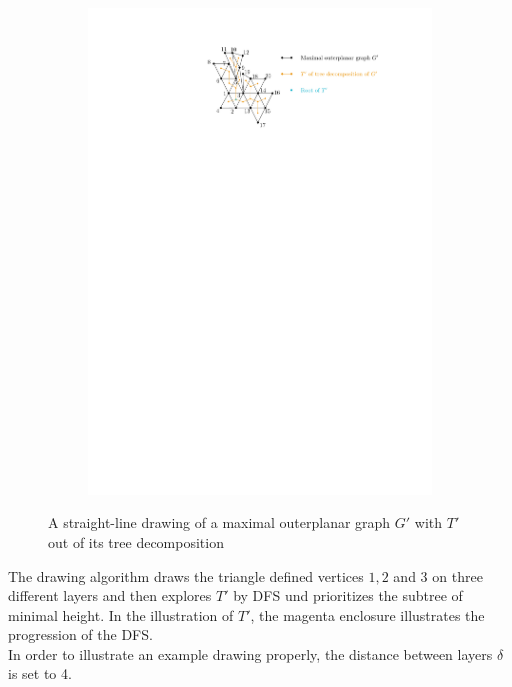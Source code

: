 \begin{figure}[H]
	\centering
	\begin{subfigure}{\textwidth}
		\centering
		\includegraphics[page=1,width=0.9\linewidth]{graphics/maximal_outerplanar_example_drawings.pdf}
	\end{subfigure}
	\caption{A straight-line drawing of a maximal outerplanar graph $G'$ with $T'$ out of its tree decomposition}\label{im:maximal_outerplanar_example_straight-line}
\end{figure}
The drawing algorithm draws the triangle defined vertices $1,2$ and $3$ on three different layers and then explores $T'$ by DFS und prioritizes the subtree of minimal height. In the illustration of $T'$, the magenta enclosure illustrates the progression of the DFS.\\
In order to illustrate an example drawing properly, the distance between layers $\delta$ is set to 4.
